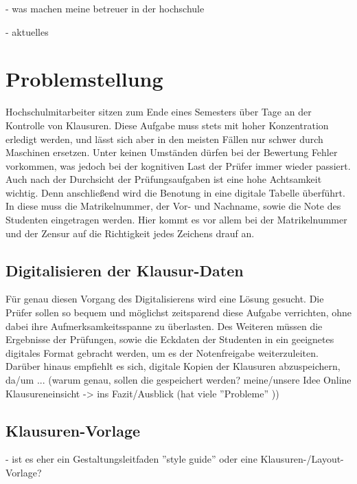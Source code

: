 \documentclass[nomenclature, 150]{HSMW-Thesis}
\begin{document}
	- was machen meine betreuer in der hochschule
	
	- aktuelles
	


\chapter{Problemstellung} 
	Hochschulmitarbeiter sitzen zum Ende eines Semesters über Tage an der Kontrolle von Klausuren. Diese Aufgabe muss stets mit hoher Konzentration erledigt werden, und lässt sich aber in den meisten Fällen nur schwer durch Maschinen ersetzen. Unter keinen Umständen dürfen bei der Bewertung Fehler vorkommen, was jedoch bei der kognitiven Last der Prüfer immer wieder passiert. Auch nach der Durchsicht der Prüfungsaufgaben ist eine hohe Achtsamkeit wichtig. Denn anschließend wird die Benotung in eine digitale Tabelle überführt. In diese muss die Matrikelnummer, der Vor- und Nachname, sowie die Note des Studenten eingetragen werden. Hier kommt es vor allem bei der Matrikelnummer und der Zensur auf die Richtigkeit jedes Zeichens drauf an. 
	
	\section{Digitalisieren der Klausur-Daten}
	Für genau diesen Vorgang des Digitalisierens wird eine Lösung gesucht. Die Prüfer sollen so bequem und möglichst zeitsparend diese Aufgabe verrichten, ohne dabei ihre Aufmerksamkeitsspanne zu überlasten. Des Weiteren müssen die Ergebnisse der Prüfungen, sowie die Eckdaten der Studenten in ein geeignetes digitales Format gebracht werden, um es der Notenfreigabe weiterzuleiten. Darüber hinaus empfiehlt es sich, digitale Kopien der Klausuren abzuspeichern, da/um ... (warum genau, sollen die gespeichert werden? meine/unsere Idee Online Klausureneinsicht -> ins Fazit/Ausblick (hat viele ''Probleme'' ))
	
	\section{Klausuren-Vorlage}
	- ist es eher ein Gestaltungsleitfaden ''style guide'' oder eine Klausuren-/Layout-Vorlage?
	
\end{document}
